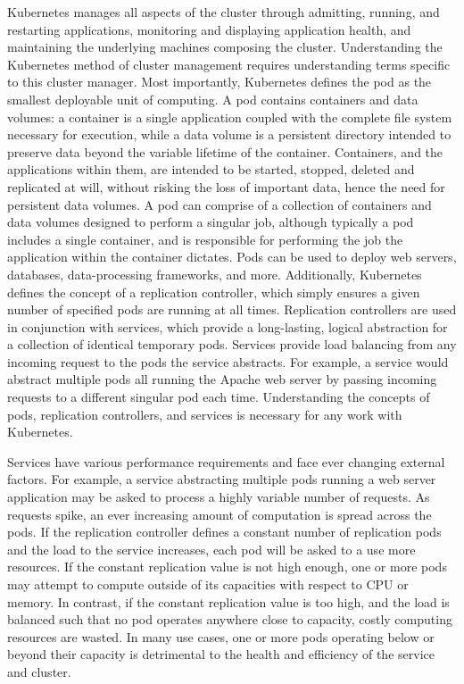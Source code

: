 \documentclass[letterpaper,11pt,twocolumn]{article}
\begin{document}
Kubernetes manages all aspects of the cluster through admitting, running, and
restarting applications, monitoring and displaying application health, and maintaining the
underlying machines composing the cluster. Understanding the Kubernetes method
of cluster management requires understanding terms specific to this cluster
manager. Most importantly, Kubernetes defines the pod as the smallest deployable unit of
computing. A pod contains containers and data
volumes: a container is a single application coupled with the complete file system
necessary for execution, while a data volume is a persistent directory intended
to preserve data beyond the variable lifetime of the
container.\cite{docker-website} Containers, and the applications within them,
are intended to be started, stopped, deleted and replicated at will, without risking
the loss of important data, hence the need for persistent data volumes.
A pod can comprise of a collection of containers and
data volumes designed to perform a singular job, although typically a pod
includes a single container, and is responsible for performing the job the
application within the container dictates. Pods can be used to deploy web
servers, databases, data-processing frameworks, and more.\cite{k8s-pods} Additionally,
Kubernetes defines the concept of a replication controller, which simply ensures
a given number of specified pods are running at all
times.\cite{k8s-replication-controllers} Replication
controllers are used in conjunction with services, which provide a long-lasting,
logical abstraction for a collection of identical temporary pods.
Services provide load balancing from any incoming request to the pods the
service abstracts.\cite{k8s-services} For example, a service would abstract
multiple pods all running the Apache web server by passing incoming requests to
a different singular pod each time. Understanding the concepts of pods,
replication controllers, and services is necessary for any work with Kubernetes.

Services have various performance requirements and face ever
changing external factors. For example, a service abstracting multiple pods
running a web server application
may be asked to process a highly variable number of requests. As requests spike,
an ever increasing amount of computation is spread across the pods. If the
replication controller defines a constant number of replication pods and the
load to the service increases, each pod will be asked to a use more resources.
If the constant replication value is not high enough, one or more pods may attempt to
compute outside of its capacities with respect to CPU or memory.
In contrast, if the constant replication value is too high,
and the load is balanced such that no pod operates anywhere
close to capacity, costly computing resources are wasted.
In many use cases, one or more pods operating below or beyond their capacity
is detrimental to the health and efficiency of the service and cluster.
\end{document}
